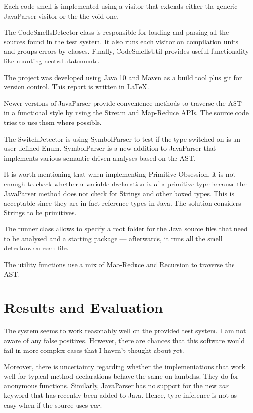 \documentclass[a4paper]{article}
\begin{document}
Each code smell is implemented using a visitor that extends either
the generic JavaParser visitor or the the void one.

The CodeSmellsDetector class is responsible for loading and parsing all
the sources found in the test system.
It also runs each visitor on compilation units and
groups errors by classes.
Finally, CodeSmellsUtil provides useful functionality like counting
nested statements.

The project was developed using Java 10 and Maven as a build tool plus git for
version control. This report is written in \LaTeX.

Newer versions of JavaParser provide convenience methods to traverse the AST
in a functional style by using the Stream and Map-Reduce APIs.
The source
code tries to use them where possible.

The SwitchDetector is using SymbolParser to test if the type switched on
is an user defined Enum.
SymbolParser is a new addition to JavaParser that implements various 
semantic-driven analyses
based on the AST.

It is worth mentioning that when implementing Primitive Obsession, it is not
enough to check whether a variable declaration is of a primitive type because
the JavaParser method does not check for Strings and other boxed types.
This is acceptable since they are in fact reference types in Java.
The solution considers Strings to be primitives.

The runner class allows to specify a root folder for the Java source files
that need to be analysed and a starting package --- afterwards, it runs
all the smell detectors on each file.

The utility functions use a mix of Map-Reduce and Recursion to traverse the AST.

\section{Results and Evaluation}

The system seems to work reasonably well on the provided test system.
I am not
aware of any false positives. However, there are chances that this software
would fail in more complex cases that I haven't thought about yet.

Moreover, there is uncertainty regarding whether the implementations that work
well for typical method declarations behave the same on lambdas.
They do for anonymous functions.
Similarly, JavaParser has no support for the new $var$ keyword that has recently
been added to Java. Hence, type inference is not as easy when if the source
uses $var$.
\end{document}
